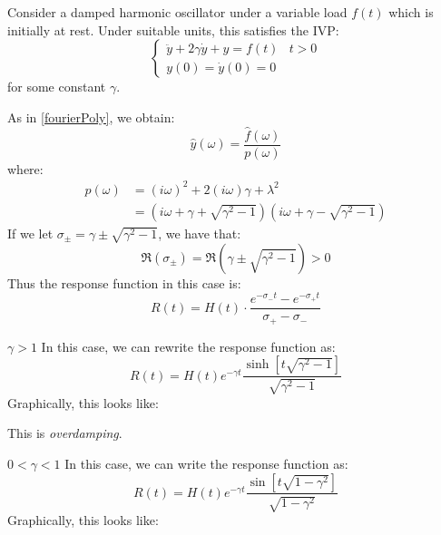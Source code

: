\documentclass[../main.tex]{subfiles}
\begin{document}
\begin{example}
  Consider a damped harmonic oscillator under a variable load $f(t)$ which is initially at rest.
  Under suitable units, this satisfies the IVP:
  \[
    \begin{cases}
    \ddot{y} + 2\gamma \dot{y} + y = f(t) & t > 0 \\
    y(0) = \dot{y}(0) = 0 &
    \end{cases}
  \]
  for some constant $\gamma$.

  As in \cref{fourierPoly}, we obtain:
  \[
    \hat{y}(\omega) = \frac{\hat{f}(\omega)}{p(\omega)}
  \]
  where:
  \begin{align*}
    p(\omega) &= (i\omega)^2 + 2(i\omega)\gamma + \lambda^2 \\
              &= (i\omega + \gamma + \sqrt{\gamma^2 - 1})(i\omega + \gamma - \sqrt{\gamma^2 - 1})
  \end{align*}
  If we let $\sigma_{\pm} = \gamma \pm \sqrt{\gamma^2 - 1}$, we have that:
  \[
    \Re(\sigma_{\pm}) = \Re(\gamma \pm \sqrt{\gamma^2 - 1}) > 0
  \]
  Thus the response function in this case is:
  \[
    R(t) = H(t) \cdot \frac{e^{-\sigma_{-}t} - e^{-\sigma_{+}t}}{\sigma_{+} - \sigma_{-}}
  \]
  \begin{proofcases}
    \begin{case}{$\gamma > 1$}
      In this case, we can rewrite the response function as:
      \[
        R(t) = H(t) e^{-\gamma t} \frac{\sinh[t\sqrt{\gamma^2 - 1}]}{\sqrt{\gamma^2 - 1}}
      \]
      Graphically, this looks like:
      \begin{center}
      \end{center}
      This is \textit{overdamping}.
    \end{case}
    \begin{case}{$0 < \gamma < 1$}
      In this case, we can write the response function as:
      \[
        R(t) = H(t) e^{-\gamma t} \frac{\sin[t \sqrt{1 - \gamma^2}]}{\sqrt{1 - \gamma^2}}
      \]
      Graphically, this looks like:
      \begin{center}
\end{center}
\end{case}
\end{proofcases}
\end{example}
\end{document}
